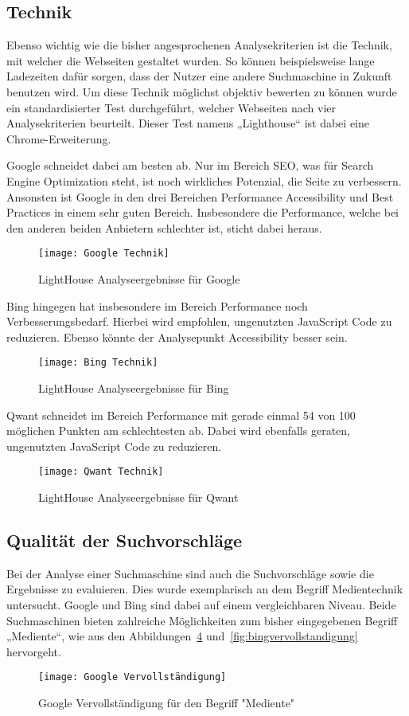 \subsection{Technik}\label{subsec:technik}
Ebenso wichtig wie die bisher angesprochenen Analysekriterien ist die Technik, mit welcher die Webseiten gestaltet wurden.
So können beispielsweise lange Ladezeiten dafür sorgen, dass der Nutzer eine andere Suchmaschine in Zukunft benutzen wird.
Um diese Technik möglichst objektiv bewerten zu können wurde ein standardisierter Test durchgeführt,
welcher Webseiten nach vier Analysekriterien beurteilt.
Dieser Test namens „Lighthouse“ ist dabei eine Chrome-Erweiterung.

Google schneidet dabei am besten ab.
Nur im Bereich SEO, was für Search Engine Optimization steht, ist noch wirkliches Potenzial, die Seite zu verbessern.
Ansonsten ist Google in den drei Bereichen Performance Accessibility und Best Practices in einem sehr guten Bereich.
Insbesondere die Performance, welche bei den anderen beiden Anbietern schlechter ist, sticht dabei heraus.
\begin{figure}[ht]
    \centering
    \texttt{[image: Google Technik]}
    \caption{LightHouse Analyseergebnisse für Google}\label{fig:figure10}
\end{figure}

Bing hingegen hat insbesondere im Bereich Performance noch Verbesserungsbedarf.
Hierbei wird empfohlen, ungenutzten JavaScript Code zu reduzieren.
Ebenso könnte der Analysepunkt Accessibility besser sein.
\begin{figure}[ht]
    \centering
    \texttt{[image: Bing Technik]}
    \caption{LightHouse Analyseergebnisse für Bing}\label{fig:figure11}
\end{figure}

Qwant schneidet im Bereich Performance mit gerade einmal 54 von 100 möglichen Punkten am schlechtesten ab. Dabei wird ebenfalls
geraten, ungenutzten JavaScript Code zu reduzieren.
\begin{figure}[ht]
    \centering
    \texttt{[image: Qwant Technik]}
    \caption{LightHouse Analyseergebnisse für Qwant}\label{fig:figure12}
\end{figure}

\subsection{Qualität der Suchvorschläge}\label{subsec:qualitat-der-suchvorschlage}
Bei der Analyse einer Suchmaschine sind auch die Suchvorschläge sowie die Ergebnisse zu evaluieren.
Dies wurde exemplarisch an dem Begriff Medientechnik untersucht.
Google und Bing sind dabei auf einem vergleichbaren Niveau.
Beide Suchmaschinen bieten zahlreiche Möglichkeiten zum bisher eingegebenen Begriff „Mediente“, wie aus den Abbildungen~\ref{fig:googlevervollstandigung} und~\ref{fig:bingvervollstandigung} hervorgeht.
\begin{figure}[ht]
    \centering
    \texttt{[image: Google Vervollständigung]}
    \caption{Google Vervollständigung für den Begriff "Mediente"}
    \label{fig:googlevervollstandigung}
\end{figure}

